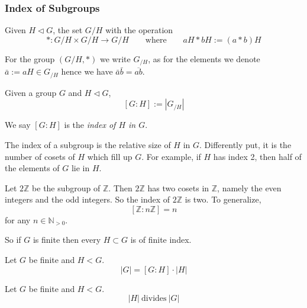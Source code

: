\subsubsection{Index of Subgroups}
\begin{definition}
   Given \(H \triangleleft G\), the set \(G/H\) with the operation
   \[\ast: G/H \times G/H \to G/H \qquad\text{where}\qquad aH \ast bH := (a \ast b)H\]
\end{definition}
\begin{remark}[Notation]
   For the group \((G/H, \ast)\) we write \(G_{/H}\), as for the elements we denote \(\bar{a} := aH \in G_{/H}\) hence we have \(\bar{a}\bar{b} = \overline{ab}\).
\end{remark}

\begin{definition}
   Given a group \(G\) and \(H \triangleleft G\),
   \[[G:H] := |G_{/H}|\]
\end{definition}
\begin{remark}[Terminology]
   We say \([G:H]\) is the \emph{index of \(H\) in \(G\)}.
\end{remark}
\begin{remark}[Intuition]
   The index of a subgroup is the relative size of \(H\) in \(G\).
   Differently put, it is the number of cosets of \(H\) which fill up \(G\).
   For example, if \(H\) has index 2, then half of the elements of \(G\) lie in \(H\).
\end{remark}
\begin{example}
   Let \(2\mathbb{Z}\) be the subgroup of \(\mathbb{Z}\).
   Then \(2\mathbb{Z}\) has two cosets in \(\mathbb{Z}\), namely the even integers and the odd integers.
   So the index of \(2\mathbb{Z}\) is two.
   To generalize,
   \[[\mathbb{Z} : n\mathbb{Z}] = n\]
   for any \(n \in \mathbb{N}_{>0}\).
\end{example}
\begin{remark}
   So if \(G\) is finite then every \(H \subset G\) is of finite index.
\end{remark}

\begin{proposition}\label{pro:index_formula}
   Let \(G\) be finite and \(H < G\).
   \[|G| = [G:H] \cdot |H|\]
\end{proposition}

\begin{corollary}
   Let \(G\) be finite and \(H < G\).
   \[|H|~\text{divides}~|G|\]
\end{corollary}


